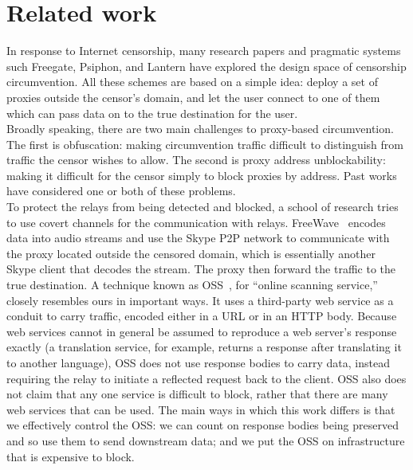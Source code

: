 \documentclass{article}
\begin{document}

\section{Related work}

In response to Internet censorship, many research papers and pragmatic systems
such Freegate, Psiphon, and Lantern have explored the design space of censorship
circumvention. All these schemes are based on a simple idea: deploy a set of
proxies outside the censor's domain, and let the user connect to one of them
which can pass data on to the true destination for the user.\\

Broadly speaking, there are two main challenges to proxy-based circumvention.
The first is obfuscation: making circumvention traffic difficult to distinguish
from traffic the censor wishes to allow. The second is proxy address
unblockability: making it difficult for the censor simply to block proxies by
address. Past works have considered one or both of these problems.\\

To protect the relays from being detected and blocked, a school of research
tries to use covert channels for the communication with relays. FreeWave~\cite{freewave}
encodes data into audio streams and use the Skype P2P network to communicate
with the proxy located outside the censored domain, which is essentially another
Skype client that decodes the stream. The proxy then forward the traffic to the
true destination. A technique known as OSS~\cite{oss}, for ``online scanning
service,'' closely resembles ours in important ways. It uses a third-party web
service as a conduit to carry traffic, encoded either in a URL or in an HTTP
body. Because web services cannot in general be assumed to reproduce a web
server's response exactly (a translation service, for example, returns a
response after translating it to another language), OSS does not use response
bodies to carry data, instead requiring the relay to initiate a reflected
request back to the client. OSS also does not claim that any one service is
difficult to block, rather that there are many web services that can be used.
The main ways in which this work differs is that we effectively control the OSS:
we can count on response bodies being preserved and so use them to send
downstream data; and we put the OSS on infrastructure that is expensive to
block.\\
\end{document}
